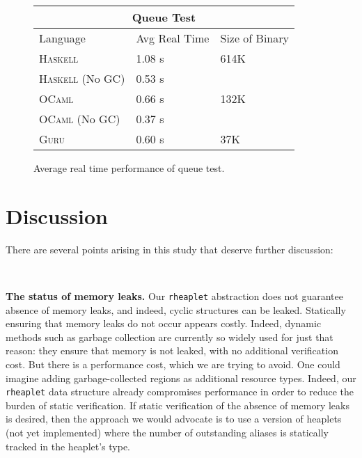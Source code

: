 \documentclass[9pt,natbib]{sigplanconf}
\begin{document}
\begin{figure}
\begin{center}
\begin{tabular}{| l | l | l |}
\hline
\multicolumn{3}{|c|}{Queue Test} \\
\hline
Language & Avg Real Time & Size of Binary\\
\hline
\textsc{Haskell} & 1.08 s & 614K \\
\textsc{Haskell} (No GC) & 0.53 s & \  \\
\textsc{OCaml} & 0.66 s & 132K \\
\textsc{OCaml} (No GC) & 0.37 s &\ \\
\textsc{Guru} & 0.60 s & 37K \\
\hline
\end{tabular}
\end{center}
\caption{Average real time performance of queue test.}
\label{queuestats}
\end{figure}

\section{Discussion}
\label{sec:future}

There are several points arising in this study that deserve further discussion:

\ 

\textbf{The status of memory leaks.} Our \texttt{rheaplet} abstraction
does not guarantee absence of memory leaks, and indeed, cyclic
structures can be leaked.  Statically ensuring that memory leaks do
not occur appears costly.  Indeed, dynamic methods such as garbage
collection are currently so widely used for just that reason: they
ensure that memory is not leaked, with no additional verification
cost.  But there is a performance cost, which we are trying to avoid.
One could imagine adding garbage-collected regions as additional
resource types.  Indeed, our \texttt{rheaplet} data structure already
compromises performance in order to reduce the burden of static
verification.  If static verification of the absence of memory leaks
is desired, then the approach we would advocate is to use a version of
heaplets (not yet implemented) where the number of outstanding aliases
is statically tracked in the heaplet's type.  

\end{document}
